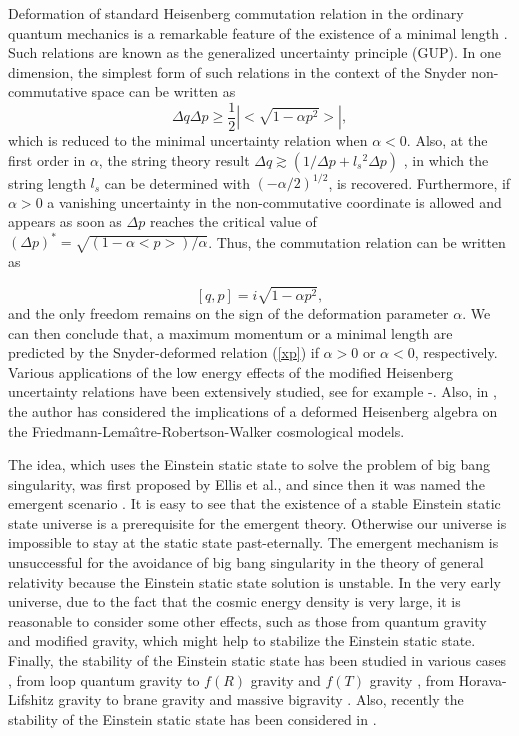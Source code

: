 \documentclass[showpacs,amsmath,nofootinbib,amssymb,epsfig]{revtex4}
\begin{document}
Deformation of standard Heisenberg commutation relation in the ordinary quantum mechanics is a remarkable feature of the existence of a minimal length {\cite{g,h}}. Such relations are known as the generalized uncertainty principle (GUP). In one dimension,
the simplest form of such relations in the context of the Snyder non-commutative space \cite{ss} can be written as
\begin{equation}\label{uncrel}
\Delta q\Delta p\geq \frac{1}{2}|<\sqrt{1-\alpha p^2}>|,
\end{equation}
which is reduced to  the minimal uncertainty relation when $\alpha<0$. Also, at the first order in $\alpha$, the string theory result  $\Delta q\gtrsim(1/\Delta p+l{_s}^{2}\Delta p)$ \cite{i}, in which the string length $l_{s}$ can be determined with $(-\alpha/2)^{1/2}$, is recovered. Furthermore, if $\alpha>0$ a vanishing uncertainty in the non-commutative coordinate is allowed and appears as soon as $\Delta p$ reaches the critical value of $(\Delta p)^{\ast}=\sqrt{(1-\alpha< p>)/\alpha}$. Thus, the commutation relation can be written as

\begin{equation}\label{xp}
[q,p]=i\sqrt{1-\alpha p^{2}},
\end{equation}
and the only freedom remains on the sign of the deformation parameter $\alpha$. We can then conclude that, a maximum momentum or a minimal length are predicted by the Snyder-deformed relation (\ref{xp}) if $\alpha>0$ or $\alpha<0$, respectively. Various applications of the low energy
effects of the modified Heisenberg uncertainty relations have been
extensively studied, see for example \cite{12}-\cite{16}. Also, in \cite{marco}, the author has considered the implications of a deformed Heisenberg algebra on the Friedmann-Lema\^{\i}tre-Robertson-Walker  cosmological models.

The idea, which uses the Einstein static state to solve the problem of big bang singularity, was first proposed by Ellis et al., and since then it was named the emergent scenario \cite{3,4}. It is easy to see that the existence of a stable Einstein static state universe is a prerequisite for the emergent theory. Otherwise our universe is impossible to stay at the static state past-eternally. The emergent mechanism is unsuccessful for the avoidance of big bang singularity in the theory of general relativity because the Einstein static state solution is unstable. In the very early universe, due to the
fact that the cosmic energy density is very large, it is reasonable to consider some other effects, such as those from quantum gravity and modified gravity, which might help to stabilize the Einstein static state.
Finally,  the stability of the Einstein static state has been studied
in various cases \cite{Carneiro, Mulryne, Parisi, Wu,
Lidsey, Bohmer2007, Seahra, Bohmer2009, Barrow,
Barrow2009, Clifton,Boehmer2010, Boehmer20093, Wu20092,
Odrzywolek, Labrana}, from loop quantum gravity \cite{Mulryne, Parisi, Wu} to $f(R)$ gravity  \cite{Boehmer2010} and $f(T)$ gravity \cite{ft}, from Horava-Lifshitz gravity \cite{Wu20092,Odrzywolek} to brane gravity \cite{Lidsey,ata1} and massive bigravity \cite{mass}. Also, recently  the stability of the Einstein static state has been considered in \cite{ata2,ata3}.
\end{document}
